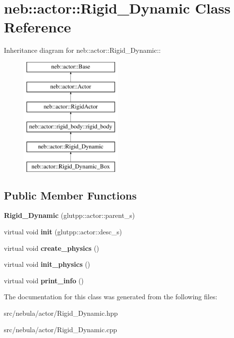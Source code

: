 \hypertarget{classneb_1_1actor_1_1Rigid__Dynamic}{
\section{neb::actor::Rigid\_\-Dynamic Class Reference}
\label{classneb_1_1actor_1_1Rigid__Dynamic}
}
Inheritance diagram for neb::actor::Rigid\_\-Dynamic::\begin{figure}[H]
\begin{center}
\leavevmode
\includegraphics[height=6cm]{classneb_1_1actor_1_1Rigid__Dynamic}
\end{center}
\end{figure}
\subsection*{Public Member Functions}
\begin{DoxyCompactItemize}
\item 
\hypertarget{classneb_1_1actor_1_1Rigid__Dynamic_ab532d1a36c9b942caa1e136d274308f8}{
{\bfseries Rigid\_\-Dynamic} (glutpp::actor::parent\_\-s)}
\label{classneb_1_1actor_1_1Rigid__Dynamic_ab532d1a36c9b942caa1e136d274308f8}

\item 
\hypertarget{classneb_1_1actor_1_1Rigid__Dynamic_a8ed2e28125967f980bb55d5697ea5b81}{
virtual void {\bfseries init} (glutpp::actor::desc\_\-s)}
\label{classneb_1_1actor_1_1Rigid__Dynamic_a8ed2e28125967f980bb55d5697ea5b81}

\item 
\hypertarget{classneb_1_1actor_1_1Rigid__Dynamic_a22912f857b64132c4638e94a3454a801}{
virtual void {\bfseries create\_\-physics} ()}
\label{classneb_1_1actor_1_1Rigid__Dynamic_a22912f857b64132c4638e94a3454a801}

\item 
\hypertarget{classneb_1_1actor_1_1Rigid__Dynamic_a81bda0edf17d6b7ed7f0c807cc23cc33}{
virtual void {\bfseries init\_\-physics} ()}
\label{classneb_1_1actor_1_1Rigid__Dynamic_a81bda0edf17d6b7ed7f0c807cc23cc33}

\item 
\hypertarget{classneb_1_1actor_1_1Rigid__Dynamic_a20ebed0437aec0f1ad5ca0bb2c2edf4a}{
virtual void {\bfseries print\_\-info} ()}
\label{classneb_1_1actor_1_1Rigid__Dynamic_a20ebed0437aec0f1ad5ca0bb2c2edf4a}

\end{DoxyCompactItemize}


The documentation for this class was generated from the following files:\begin{DoxyCompactItemize}
\item 
src/nebula/actor/Rigid\_\-Dynamic.hpp\item 
src/nebula/actor/Rigid\_\-Dynamic.cpp\end{DoxyCompactItemize}
